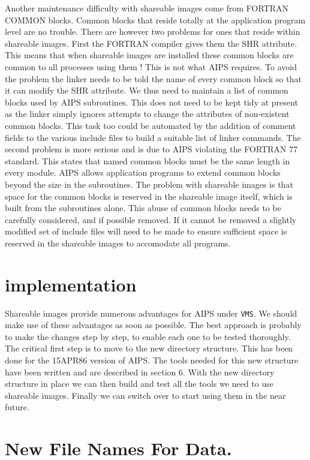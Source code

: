 Another maintenance difficulty with shareable images come from FORTRAN
COMMON blocks. Common blocks that reside totally at the application
program level are no trouble. There are however two problems for ones
that reside within shareable images. First the FORTRAN compiler gives
them the SHR attribute. This means that when shareable images are
installed these common blocks are common to all processes using them !
This is not what AIPS requires. To avoid the problem the linker needs to
be told the name of every common block so that it can modify the SHR
attribute. We thus need to maintain a list of common blocks used by AIPS
subroutines. This does not need to be kept tidy at present as the linker
simply ignores attempts to change the attributes of non-existent common
blocks. This task too could be automated by the addition of comment
fields to the various include files to build a suitable list of linker
commands. The second problem is more serious and is due to AIPS
violating the FORTRAN 77 standard. This states that named common blocks
must be the same length in every module. AIPS allows application
programs to extend common blocks beyond the size in the subroutines. The
problem with shareable images is that space for the common blocks is
reserved in the shareable image itself, which is built from the
subroutines alone. This abuse of common blocks needs to be carefully
considered, and if possible removed. If it cannot be removed a slightly
modified set of include files will need to be made to ensure sufficient
space is reserved in the shareable images to accomodate all programs.

\section{ implementation }

Shareable images provide numerous advantages for AIPS under {\tt VMS\/}. We
should make use of these advantages as soon as possible. The best
approach is probably to make the changes step by step, to enable each one
to be tested thoroughly. The critical first step is to move to the new
directory structure. This has been done for the 15APR86 version of
AIPS.  The tools needed for this new structure have been written and
are described in section 6.  With the new directory structure in
place we can then build and test all the
tools we need to use shareable images. Finally we can switch over to
start using them in the near future.

\section{ New File Names For Data. }

